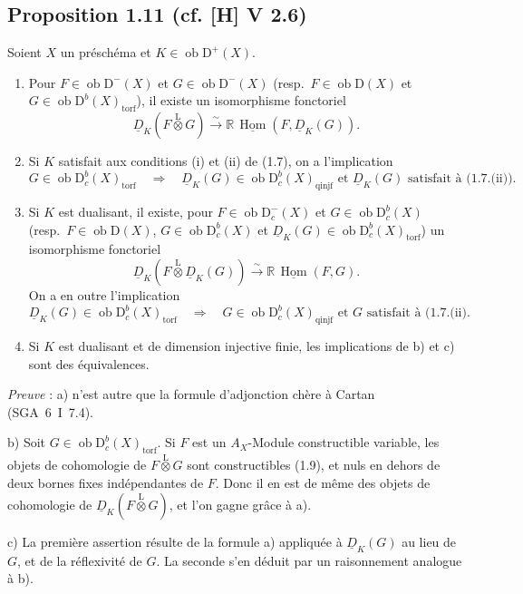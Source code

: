 \documentclass[11pt]{article}
\DeclareMathOperator{\Hom}{Hom}
\newcommand{\R}{\mathbb{R}}\newcommand{\RHomCore}{\mathbb{R}\mathrm{Hom}}
\newcommand{\D}{\mathrm{D}}
\newcommand{\ob}{\operatorname{ob}}
\providecommand{\Hom}{\operatorname{Hom}}
\providecommand{\ob}{\operatorname{ob}}
\providecommand{\R}{\mathrm R}
\providecommand{\Hom}{\operatorname{Hom}}
\begin{document}
\subsection*{Proposition 1.11 (cf. [H] V 2.6)}
Soient $X$ un préschéma et $K \in \ob \D^{+}(X)$.
\begin{enumerate}
\item[a)] Pour $F \in \ob \D^{-}(X)$ et $G \in \ob \D^{-}(X)$ (resp.~$F \in \ob \D(X)$ et $G \in \ob \D^{b}(X)_{\mathrm{torf}}$), il existe un isomorphisme fonctoriel
\[
\underline{D}_K(F \mathop{\otimes}\limits^{\mathrm{L}} G) \xrightarrow{\sim} \R\,\underline{\Hom}(F, \underline{D}_K(G)).
\]
\item[b)] Si $K$
satisfait aux conditions (i) et (ii) de (1.7), on a l'implication
\[
G \in \ob \D_c^{b}(X)_{\mathrm{torf}} \quad \Longrightarrow \quad \underline{D}_K(G) \in \ob \D_c^{b}(X)_{\mathrm{qinjf}} \text{ et } \underline{D}_K(G) \text{ satisfait à (1.7.(ii)).}
\]
\item[c)] Si $K$ est dualisant, il existe, pour $F \in \ob \D_c^{-}(X)$ et $G \in \ob \D_c^{b}(X)$ (resp.~$F \in \ob \D(X)$, $G \in \ob \D_c^{b}(X)$ et $\underline{D}_K(G) \in \ob \D_c^{b}(X)_{\mathrm{torf}}$) un isomorphisme fonctoriel
\[
\underline{D}_K(F \mathop{\otimes}\limits^{\mathrm{L}} \underline{D}_K(G)) \xrightarrow{\sim} \R\,\underline{\Hom}(F, G).
\]
On a en outre l'implication
\[
\underline{D}_K(G) \in \ob \D_c^{b}(X)_{\mathrm{torf}} \quad \Longrightarrow \quad G \in \ob \D_c^{b}(X)_{\mathrm{qinjf}} \text{ et } G \text{ satisfait à (1.7.(ii).}
\]
\item[d)] Si $K$ est dualisant et de dimension injective finie, les implications de b) et c) sont des équivalences.
\end{enumerate}

\emph{Preuve} : a) n'est autre que la formule d'adjonction chère à Cartan (SGA~6~I~7.4).

b) Soit $G \in \ob \D_c^{b}(X)_{\mathrm{torf}}$. Si $F$ est un $A_X$-Module constructible variable, les objets de cohomologie de $F \mathop{\otimes}\limits^{\mathrm{L}} G$ sont constructibles (1.9), et nuls en dehors de deux bornes fixes indépendantes de $F$. Donc il en est de même des objets de cohomologie de $\underline{D}_K(F \mathop{\otimes}\limits^{\mathrm{L}} G)$, et l'on gagne grâce à a).

c) La première assertion résulte de la formule a) appliquée à $\underline{D}_K(G)$ au lieu de $G$, et de la réflexivité de $G$. La seconde s'en déduit par un raisonnement analogue à b).
\end{document}
